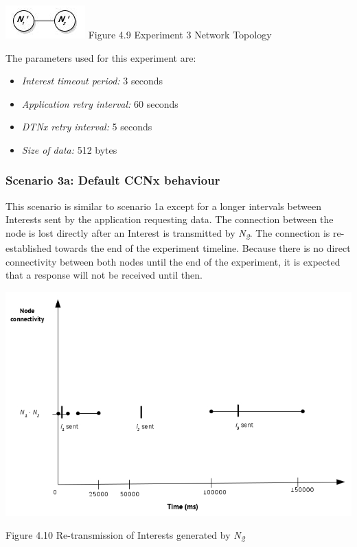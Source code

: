 \documentclass[a4paper,12pt]{report}      %
\begin{document}
\begin{center}
\includegraphics[scale=0.75]{exp3topo.jpg}\newline
Figure 4.9 Experiment 3 Network Topology 
\end{center}

\noindent The parameters used for this experiment are:
\begin{itemize}
\item \textsl{Interest timeout period:} 3 seconds
\item \textsl{Application retry interval:} 60 seconds
\item \textsl{DTNx retry interval:} 5 seconds
\item \textsl{Size of data:} 512 bytes
\end{itemize}

\subsubsection{Scenario 3a: Default CCNx behaviour}

This scenario is similar to scenario 1a except for a longer intervals between Interests sent by the application requesting data. The connection between the node is lost directly after an Interest is transmitted by \emph{N\textsubscript{2}}. The connection is re-established towards the end of the experiment timeline. Because there is no direct connectivity between both nodes until the end of the experiment, it is expected that a response will not be received until then. 

\noindent\includegraphics[scale=0.55]{exp3a_timediag.jpg}\newline
\begin{center}Figure 4.10 Re-transmission of Interests generated by \emph{N\textsubscript{2}}\end{center} 
\end{document}
